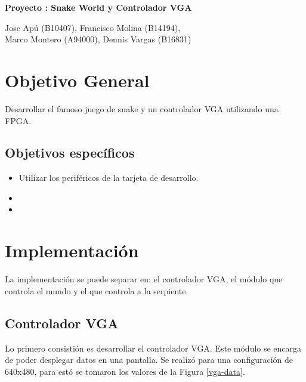 \documentclass[10pt]{article}
\begin{document}
\begin{huge}
\begin{center}
\textbf{Proyecto : Snake World y Controlador VGA}
\end{center}
\end{huge}

\begin{Large}
\begin{center}
Jose Apú (B10407), Francisco Molina (B14194), \\Marco Montero (A94000), Dennis Vargas (B16831)
\end{center}
\end{Large}

\section{Objetivo General}

Desarrollar el famoso juego de snake y un controlador VGA utilizando una FPGA.\\[0.3 cm] \cite{papilio}

\subsection{Objetivos específicos}
\begin{itemize}
\item Utilizar los periféricos de la tarjeta de desarrollo.
\item 
\item 
\end{itemize}

\section{Implementación}

La implementación se puede separar en: el controlador VGA, el módulo que controla el mundo y el que controla a la serpiente.
\subsection{Controlador VGA}

Lo primero consistión es desarrollar el controlador VGA. Este módulo se encarga de poder desplegar datos en una pantalla. Se realizó para una configuración de 640x480, para estó se tomaron los valores de la Figura \ref{vga-data}.\\
\end{document}
